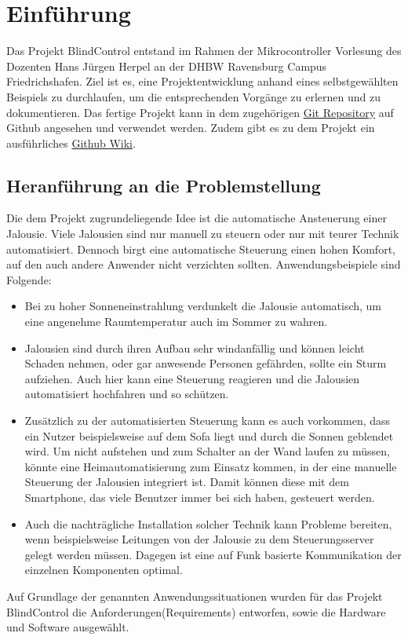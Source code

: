 \chapter{Einführung}
\label{cha:Einführung}
Das Projekt BlindControl entstand im Rahmen der Mikrocontroller Vorlesung des Dozenten Hans Jürgen Herpel an der DHBW Ravensburg Campus Friedrichshafen. Ziel ist es, eine Projektentwicklung anhand eines selbstgewählten Beispiels zu durchlaufen, um die entsprechenden Vorgänge zu erlernen und zu dokumentieren. Das fertige Projekt kann in dem zugehörigen \href{https://github.com/maxbachmann-university/BlindControl}{Git Repository} auf Github angesehen und verwendet werden. Zudem gibt es zu dem Projekt ein ausführliches \href{https://github.com/maxbachmann-university/BlindControl/wiki}{Github Wiki}.

\section{Heranführung an die Problemstellung}
Die dem Projekt zugrundeliegende Idee ist die automatische Ansteuerung einer Jalousie. Viele Jalousien sind nur manuell zu steuern oder nur mit teurer Technik automatisiert. Dennoch birgt eine automatische Steuerung einen hohen Komfort, auf den auch andere Anwender nicht verzichten sollten. Anwendungsbeispiele sind Folgende:
\begin{itemize}
	\item Bei zu hoher Sonneneinstrahlung verdunkelt die Jalousie automatisch, um eine angenehme Raumtemperatur auch im Sommer zu wahren.
	\item Jalousien sind durch ihren Aufbau sehr windanfällig und können leicht Schaden nehmen, oder gar anwesende Personen gefährden, sollte ein Sturm aufziehen. Auch hier kann eine Steuerung reagieren und die Jalousien automatisiert hochfahren und so schützen.
	\item Zusätzlich zu der automatisierten Steuerung kann es auch vorkommen, dass ein Nutzer beispielsweise auf dem Sofa liegt und durch die Sonnen geblendet wird. Um nicht aufstehen und zum Schalter an der Wand laufen zu müssen, könnte eine Heimautomatisierung zum Einsatz kommen, in der eine manuelle Steuerung der Jalousien integriert ist. Damit können diese mit dem Smartphone, das viele Benutzer immer bei sich haben, gesteuert werden.
	\item Auch die nachträgliche Installation solcher Technik kann Probleme bereiten, wenn beispielsweise Leitungen von der Jalousie zu dem Steuerungsserver gelegt werden müssen. Dagegen ist eine auf Funk basierte Kommunikation der einzelnen Komponenten optimal.
\end{itemize}
Auf Grundlage der genannten Anwendungssituationen wurden für das Projekt BlindControl die Anforderungen(Requirements) entworfen, sowie die Hardware und Software ausgewählt.

